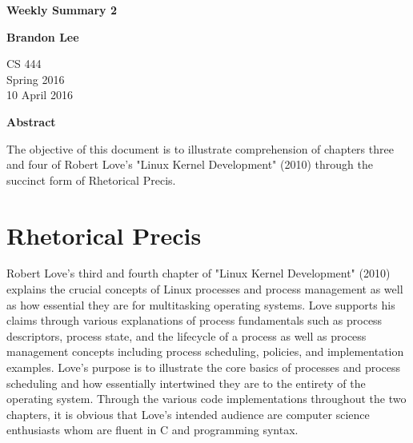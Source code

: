 \documentclass[letterpaper,10pt,titlepage]{article}
\begin{document}
\begin{titlepage}
    \begin{center}
        \vspace*{3.5cm}

        \textbf{Weekly Summary 2}

        \vspace{0.5cm}

        \textbf{Brandon Lee}

        \vspace{0.8cm}

        CS 444\\
        Spring 2016\\
        10 April 2016\\

        \vspace{1cm}

        \textbf{Abstract}\\

        \vspace{0.5cm}

        The objective of this document is to illustrate comprehension of chapters three and four of Robert Love's "Linux Kernel Development" (2010) through the succinct form of Rhetorical Precis.

        \vfill



    \end{center}
\end{titlepage}

\newpage

\section{Rhetorical Precis}

Robert Love's third and fourth chapter of "Linux Kernel Development" (2010) explains the crucial concepts of Linux processes and process management as well as how essential they are for multitasking operating systems.  Love supports his claims through various explanations of process fundamentals such as process descriptors, process state, and the lifecycle of a process as well as process management concepts including process scheduling, policies, and implementation examples.  Love's purpose is to illustrate the core basics of processes and process scheduling and how essentially intertwined they are to the entirety of the operating system.  Through the various code implementations throughout the two chapters, it is obvious that Love's intended audience are computer science enthusiasts whom are fluent in C and programming syntax.
\end{document}
